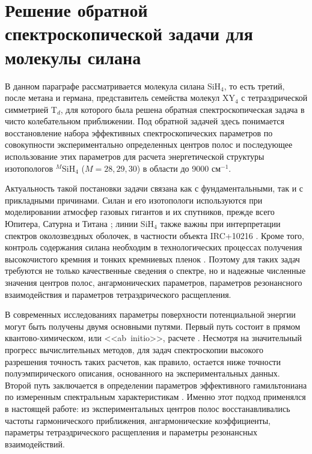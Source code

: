 \section{Решение обратной спектроскопической задачи для молекулы силана}\label{sec:ch2/Si}

В данном параграфе рассматривается молекула силана SiH$_4$, то есть третий, после метана и германа,
представитель семейства молекул XY$_4$ с тетраэдрической симметрией T$_d$, для которого была решена
обратная спектроскопическая задача в чисто колебательном приближении. Под обратной задачей здесь
понимается восстановление набора эффективных спектроскопических параметров по совокупности
экспериментально определенных центров полос и последующее использование этих параметров для
расчета энергетической структуры изотопологов ${}^{M}$SiH$_4$ ($M=28,29,30$) в области до
9000 см$^{-1}$.

Актуальность такой постановки задачи связана как с фундаментальными, так и с прикладными
причинами. Силан и его изотопологи используются при моделировании атмосфер газовых гигантов и их
спутников, прежде всего Юпитера, Сатурна и Титана \cite{003,004,005,006,007,008,009}; линии SiH$_4$
также важны при интерпретации спектров околозвездных оболочек, в частности объекта IRC+10216
\cite{010,011,012}. Кроме того, контроль содержания силана необходим в технологических процессах
получения высокочистого кремния и тонких кремниевых пленок \cite{001,002}. Поэтому для таких задач
требуются не только качественные сведения о спектре, но и надежные численные значения центров полос,
ангармонических параметров, параметров резонансного взаимодействия и параметров тетраэдрического
расщепления.

В современных исследованиях параметры поверхности потенциальной энергии могут быть получены двумя
основными путями. Первый путь состоит в прямом квантово-химическом, или <<ab~initio>>, расчете
\cite{abinitio_1,abinitio_3,abinitio_5,abinitio_6,abinitio_8,abinitio_9,abinitio_10,abinitio_11}. Несмотря на
значительный прогресс вычислительных методов, для задач спектроскопии высокого разрешения точность
таких расчетов, как правило, остается ниже точности полуэмпирического описания, основанного на
экспериментальных данных. Второй путь заключается в определении параметров эффективного
гамильтониана по измеренным спектральным характеристикам \cite{kuchitsu,nielsen,locmode,MWour}. Именно
этот подход применялся в настоящей работе: из экспериментальных центров полос восстанавливались
частоты гармонического приближения, ангармонические коэффициенты, параметры тетраэдрического
расщепления и параметры резонансных взаимодействий.

